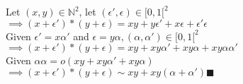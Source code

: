 \documentclass{article}
\begin{document}
\noindent Let $ (x,y) \in \mathbb{N}^2 $, let  $ (\epsilon',\epsilon) \in [0, 1[^2 $\\
$ \implies (x + \epsilon') * (y + \epsilon) = xy + y \epsilon' + x\epsilon + \epsilon'\epsilon $\\
Given $ \epsilon' = x\alpha' $ and $\epsilon = y\alpha , (\alpha,\alpha') \in [0, 1[^2$\\
$\implies (x+\epsilon') * (y + \epsilon) = xy + xy \alpha' + xy \alpha + xy \alpha\alpha' $\\
Given $  \alpha\alpha = o(xy + xy\alpha'  + xy\alpha) $ \\
$\implies (x+\epsilon') * (y + \epsilon) \sim xy + xy (\alpha + \alpha') \blacksquare$
\end{document}
